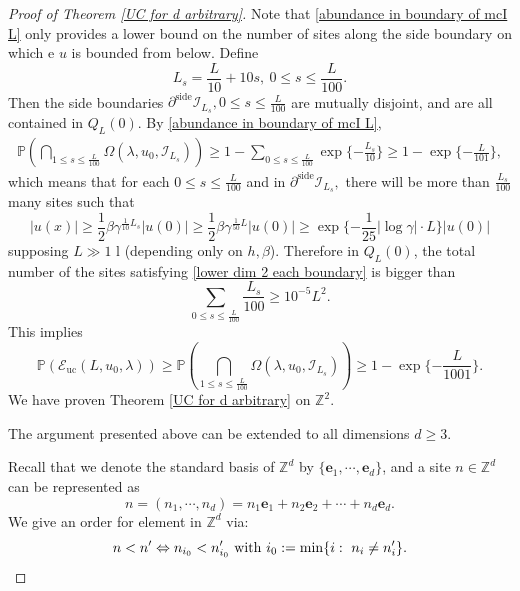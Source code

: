 \documentclass[11pt,reqno,UTF8,twoside]{amsart}
\newcommand{\Z}{\mathbb{Z}}
\newcommand{\bfe}{\mathbf{e}}
\renewcommand{\P}{\mathbb{P}}
\newcommand{\mcI}{\mathcal{I}}
\newcommand{\partialside}{\partial^{\text{side}}}
\theoremstyle{definition}
\numberwithin{equation}{section}
\begin{document}
\begin{proof}[Proof of Theorem \ref{UC for d arbitrary}]
Note that \eqref{abundance in boundary of mcI L} only provides a lower bound on the number of sites along the side boundary on which e $u$ is bounded from below. Define
 \[L_s=  \frac{L}{10}+10s, \ 0\leq s\leq \frac{L}{100}. \] 
Then the side boundaries $\partialside \mcI_{L_s},0\leq s\leq \frac{L}{100}$ are mutually disjoint, and are all contained in $Q_L(0)$. By \eqref{abundance in boundary of mcI L}, %
\begin{align*}
    \P\left(\bigcap_{1\leq s\leq \frac{L}{100}}\Omega(\lambda,u_0,\mcI_{L_s}) \right) \geq 1-\sum_{0\leq s\leq \frac{L}{100}}\exp\{-\frac{L_s}{10}\} \geq 1-\exp\{-\frac{L}{101}\},
\end{align*}
which means that for each $0\leq s\leq \frac{L}{100}$ and  in $\partialside \mcI_{L_s},$  there will be more than $\frac{L_s}{100}$  many sites such that 
\begin{equation}\label{lower dim 2 each boundary}
  |u(x)|\geq \frac{1}{2}\beta \gamma^{\frac{1}{10}L_s} |u(0)|\geq \frac{1}{2}\beta \gamma^{\frac{1}{50}L}|u(0)| \geq \exp \{{-\frac{1}{25}|\log \gamma|\cdot L}\}  |u(0)| 
\end{equation}
supposing $L\gg1$ l (depending only  on $h,\beta$). Therefore in $Q_L(0)$,  the total number of the sites satisfying \eqref{lower dim 2 each boundary} is bigger than 
\[  \sum_{ 0\leq s\leq \frac{L}{100}} \frac{L_s}{100}\geq  10^{-5}L^2 .\]
This implies  
\begin{equation}\label{increase dimension trick}
    \P \left(\mathcal{E}_{\mathrm{uc}}(L , u_0, \lambda)\right)\geq \P\left(\bigcap_{1\leq s\leq \frac{L}{100}}\Omega(\lambda,u_0,\mcI_{L_s}) \right) \geq 1-\exp\{-\frac{L}{1001}\}. 
\end{equation}
We have proven  Theorem \ref{UC for d arbitrary}  on $\Z^2$. 




The argument presented above can be  extended to all dimensions $d\geq 3$.


Recall that we denote the standard basis of $\Z^d$ by $\{\bfe_1,\cdots,\bfe_d\}$, and a site $n\in\Z^d$ can be represented as 
\[n=(n_1,\cdots,n_d)=n_1\bfe_1+n_2\bfe_2+\cdots + n_d\bfe_d.\]
We give an order for element in $\Z^d$ via:  
\begin{equation}\label{order in Zd}
  n <n' \Leftrightarrow n_{i_0}<n_{i_0}'\ {\rm with} \ i_0:= \min \{i:\  n_i\neq n_i' \}. 
\end{equation}


\end{proof}
\end{document}
